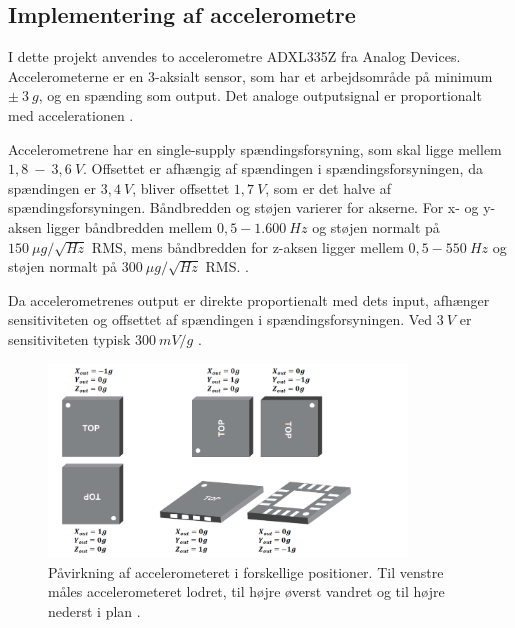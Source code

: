 \subsection{Implementering af accelerometre} \label{sec:acc}

I dette projekt anvendes to accelerometre ADXL335Z fra Analog Devices. Accelerometerne er en 3-aksialt sensor, som har et arbejdsområde på minimum $\pm~3~g$, og en spænding som output. Det analoge outputsignal er proportionalt med accelerationen \citep{analogdevices2009}. 

\noindent
Accelerometrene har en single-supply spændingsforsyning, som skal ligge mellem $1,8~-~3,6~V$.  Offsettet er afhængig af spændingen i spændingsforsyningen, da spændingen er $3,4~V$, bliver offsettet $1,7~V$, som er det halve af spændingsforsyningen. Båndbredden og støjen varierer for akserne. For x- og y-aksen ligger båndbredden mellem $0,5 - 1.600~Hz$ og støjen normalt på $150~\mu g/\sqrt{Hz}$ RMS, mens båndbredden for z-aksen ligger mellem $0,5 - 550~Hz$ og støjen normalt på $300~\mu g/\sqrt{Hz}$ RMS.  \citep{analogdevices2010}. 

Da accelerometrenes output er direkte proportienalt med dets input, afhænger sensitiviteten og offsettet af spændingen i spændingsforsyningen. Ved $3~V$ er sensitiviteten typisk $300~mV/g$ \citep{analogdevices2010}. 


\begin{figure}[H]
\centering
\includegraphics[width=0.85\textwidth]{figures/acc_paavirkning}
\caption{Påvirkning af accelerometeret i forskellige positioner. Til venstre måles accelerometeret lodret, til højre øverst vandret og til højre nederst i plan \citep{analogdevices2010}.}
\label{fig:acc}
\end{figure}


